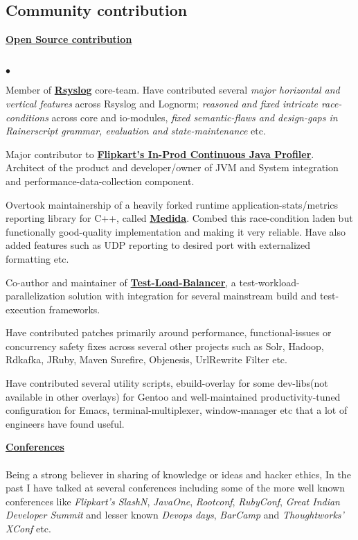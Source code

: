 \documentclass[margin,line]{res}
\newenvironment{list2}{
  \begin{list}{$\bullet$}{%
      \setlength{\itemsep}{0in}
      \setlength{\parsep}{0in} \setlength{\parskip}{0in}
      \setlength{\topsep}{0in} \setlength{\partopsep}{0in} 
      \setlength{\leftmargin}{0.2in}}}{\end{list}}
\begin{document}
\begin{resume}
\section{\sc Community contribution}
{\underline {\bf Open Source contribution}}\\
\vspace{-.2cm}\\
\begin{list2}
\item Member of \href{https://github.com/rsyslog}{\bf Rsyslog} core-team. Have contributed several {\em major horizontal and vertical features} across Rsyslog and Lognorm; {\em reasoned and fixed intricate race-conditions} across core and io-modules, {\em fixed semantic-flaws and design-gaps in Rainerscript grammar, evaluation and state-maintenance} etc.
\item Major contributor to \href{https://github.com/Flipkart/fk-prof}{\bf Flipkart's In-Prod Continuous Java Profiler}. Architect of the product and developer/owner of JVM and System integration and performance-data-collection component.
\item Overtook maintainership of a heavily forked runtime application-stats/metrics reporting library for C++, called \href{https://github.com/janmejay/medida}{\bf Medida}. Combed this race-condition laden but functionally good-quality implementation and making it very reliable. Have also added features such as UDP reporting to desired port with externalized formatting etc.
\item Co-author and maintainer of \href{http://test-load-balancer.github.io/}{\bf Test-Load-Balancer}, a test-workload-parallelization solution with integration for several mainstream build and test-execution frameworks.
\item Have contributed patches primarily around performance, functional-issues or concurrency safety fixes across several other projects such as Solr, Hadoop, Rdkafka, JRuby, Maven Surefire, Objenesis, UrlRewrite Filter etc.
\item Have contributed several utility scripts, ebuild-overlay for some dev-libs(not available in other overlays) for Gentoo and well-maintained productivity-tuned configuration for Emacs, terminal-multiplexer, window-manager etc that a lot of engineers have found useful.
\end{list2}

{\underline {\bf Conferences}}\\
\vspace{-.2cm}\\
Being a strong believer in sharing of knowledge or ideas and hacker ethics, In the past I have talked at several conferences including some of the more well known conferences like {\em Flipkart's SlashN}, {\em JavaOne}, {\em Rootconf}, {\em RubyConf}, {\em Great Indian Developer Summit} and lesser known {\em Devops days}, {\em BarCamp} and {\em Thoughtworks' XConf} etc.\\


\end{resume}
\end{document}
